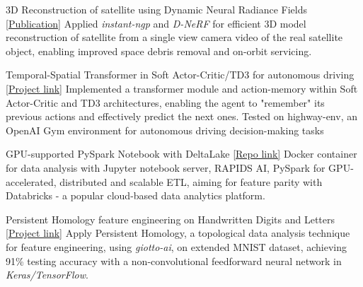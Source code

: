 \vspace{-5mm}
\vspace{-2mm}

\begin{cventries}

	\cventry
	{}
	{3D Reconstruction of satellite using Dynamic Neural Radiance Fields}
	{\href{https://arxiv.org/abs/2301.09060}{[Publication]}}
	{}
	{Applied \emph{instant-ngp} and \emph{D-NeRF} for efficient 3D model reconstruction of satellite from a single view camera video of the real satellite object, enabling improved space debris removal and on-orbit servicing.}

	\cventry
	{}
	{Temporal-Spatial Transformer in Soft Actor-Critic/TD3 for autonomous driving}
	{\href{https://github.com/sesem738/Lavenza}{[Project link]}}
	{}
	{Implemented a transformer module and action-memory within Soft Actor-Critic and TD3 architectures, enabling the agent to "remember" its previous actions and effectively predict the next ones. Tested on highway-env, an OpenAI Gym environment for autonomous driving decision-making tasks}

	\cventry
	{}
	{GPU-supported PySpark Notebook with DeltaLake}
	{\href{https://github.com/n0k0m3/pyspark-notebook-deltalake-docker}{[Repo link]}}
	{}
	{Docker container for data analysis with Jupyter notebook server, RAPIDS AI, PySpark for GPU-accelerated, distributed and scalable ETL, aiming for feature parity with Databricks - a popular cloud-based data analytics platform.}

	\cventry
	{}
	{Persistent Homology feature engineering on Handwritten Digits and Letters}
	{\href{https://colab.research.google.com/drive/18z161k3diYO6sNVBfiKH8uGqbrekxMPN?usp=sharing}{[Project link]}}
	{}
	{Apply Persistent Homology, a topological data analysis technique for feature engineering, using \emph{giotto-ai}, on extended MNIST dataset, achieving 91\% testing accuracy with a non-convolutional feedforward neural network in \emph{Keras/TensorFlow}.}




\end{cventries}
